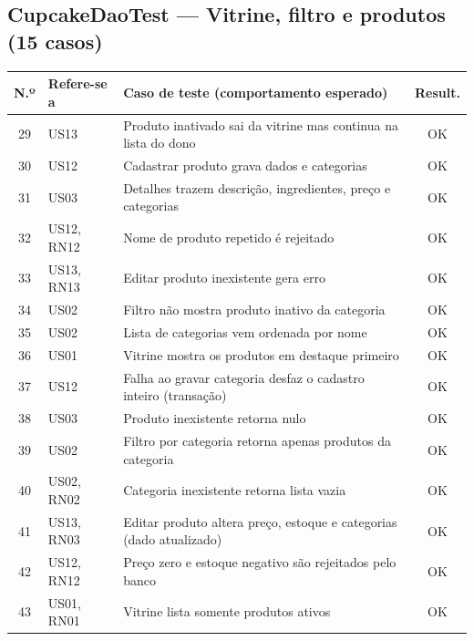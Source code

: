 \subsection*{CupcakeDaoTest --- Vitrine, filtro e produtos (15 casos)}
\footnotesize
\begin{longtable}{|c|p{2.5cm}|p{8.4cm}|c|}
\hline
\rowcolor{gray!30} \textbf{N.º} & \textbf{Refere-se a} & \textbf{Caso de teste (comportamento esperado)} & \textbf{Result.} \\ \hline
\endhead
29 & US13 & Produto inativado sai da vitrine mas continua na lista do dono & \cellcolor{green!20}OK \\ \hline
30 & US12 & Cadastrar produto grava dados e categorias & \cellcolor{green!20}OK \\ \hline
31 & US03 & Detalhes trazem descrição, ingredientes, preço e categorias & \cellcolor{green!20}OK \\ \hline
32 & US12, RN12 & Nome de produto repetido é rejeitado & \cellcolor{green!20}OK \\ \hline
33 & US13, RN13 & Editar produto inexistente gera erro & \cellcolor{green!20}OK \\ \hline
34 & US02 & Filtro não mostra produto inativo da categoria & \cellcolor{green!20}OK \\ \hline
35 & US02 & Lista de categorias vem ordenada por nome & \cellcolor{green!20}OK \\ \hline
36 & US01 & Vitrine mostra os produtos em destaque primeiro & \cellcolor{green!20}OK \\ \hline
37 & US12 & Falha ao gravar categoria desfaz o cadastro inteiro (transação) & \cellcolor{green!20}OK \\ \hline
38 & US03 & Produto inexistente retorna nulo & \cellcolor{green!20}OK \\ \hline
39 & US02 & Filtro por categoria retorna apenas produtos da categoria & \cellcolor{green!20}OK \\ \hline
40 & US02, RN02 & Categoria inexistente retorna lista vazia & \cellcolor{green!20}OK \\ \hline
41 & US13, RN03 & Editar produto altera preço, estoque e categorias (dado atualizado) & \cellcolor{green!20}OK \\ \hline
42 & US12, RN12 & Preço zero e estoque negativo são rejeitados pelo banco & \cellcolor{green!20}OK \\ \hline
43 & US01, RN01 & Vitrine lista somente produtos ativos & \cellcolor{green!20}OK \\ \hline
\end{longtable}\normalsize
